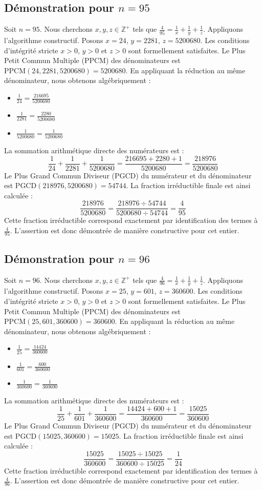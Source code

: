 \documentclass[11pt,a4paper]{article}
\begin{document}
\subsection{Démonstration pour $n = 95$}
Soit $n = 95$. Nous cherchons $x, y, z \in \mathbb{Z}^{+}$ tels que $\frac{4}{95} = \frac{1}{x} + \frac{1}{y} + \frac{1}{z}$.
Appliquons l'algorithme constructif. Posons $x = 24$, $y = 2281$, $z = 5200680$.
Les conditions d'intégrité stricte $x > 0$, $y > 0$ et $z > 0$ sont formellement satisfaites.
Le Plus Petit Commun Multiple (PPCM) des dénominateurs est $\text{PPCM}(24, 2281, 5200680) = 5200680$.
En appliquant la réduction au même dénominateur, nous obtenons algébriquement :
\begin{itemize}
    \item $\frac{1}{24} = \frac{216695}{5200680}$
    \item $\frac{1}{2281} = \frac{2280}{5200680}$
    \item $\frac{1}{5200680} = \frac{1}{5200680}$
\end{itemize}
La sommation arithmétique directe des numérateurs est :
$$ \frac{1}{24} + \frac{1}{2281} + \frac{1}{5200680} = \frac{216695 + 2280 + 1}{5200680} = \frac{218976}{5200680} $$
Le Plus Grand Commun Diviseur (PGCD) du numérateur et du dénominateur est $\text{PGCD}(218976, 5200680) = 54744$.
La fraction irréductible finale est ainsi calculée :
$$ \frac{218976}{5200680} = \frac{218976 \div 54744}{5200680 \div 54744} = \frac{4}{95} $$
Cette fraction irréductible correspond exactement par identification des termes à $\frac{4}{95}$. L'assertion est donc démontrée de manière constructive pour cet entier.

\subsection{Démonstration pour $n = 96$}
Soit $n = 96$. Nous cherchons $x, y, z \in \mathbb{Z}^{+}$ tels que $\frac{4}{96} = \frac{1}{x} + \frac{1}{y} + \frac{1}{z}$.
Appliquons l'algorithme constructif. Posons $x = 25$, $y = 601$, $z = 360600$.
Les conditions d'intégrité stricte $x > 0$, $y > 0$ et $z > 0$ sont formellement satisfaites.
Le Plus Petit Commun Multiple (PPCM) des dénominateurs est $\text{PPCM}(25, 601, 360600) = 360600$.
En appliquant la réduction au même dénominateur, nous obtenons algébriquement :
\begin{itemize}
    \item $\frac{1}{25} = \frac{14424}{360600}$
    \item $\frac{1}{601} = \frac{600}{360600}$
    \item $\frac{1}{360600} = \frac{1}{360600}$
\end{itemize}
La sommation arithmétique directe des numérateurs est :
$$ \frac{1}{25} + \frac{1}{601} + \frac{1}{360600} = \frac{14424 + 600 + 1}{360600} = \frac{15025}{360600} $$
Le Plus Grand Commun Diviseur (PGCD) du numérateur et du dénominateur est $\text{PGCD}(15025, 360600) = 15025$.
La fraction irréductible finale est ainsi calculée :
$$ \frac{15025}{360600} = \frac{15025 \div 15025}{360600 \div 15025} = \frac{1}{24} $$
Cette fraction irréductible correspond exactement par identification des termes à $\frac{4}{96}$. L'assertion est donc démontrée de manière constructive pour cet entier.
\end{document}
